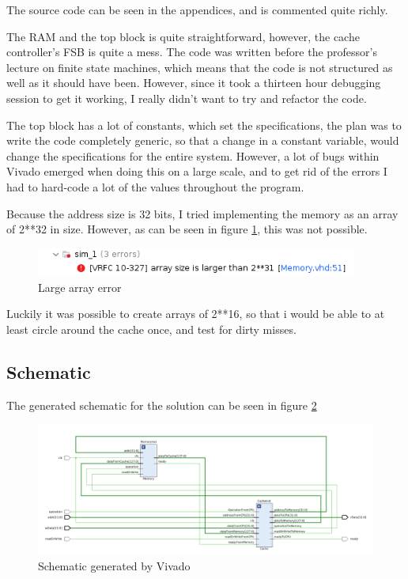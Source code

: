 \documentclass{article}
\begin{document}
The source code can be seen in the appendices, and is commented quite richly.

The RAM and the top block is quite straightforward, however, the cache controller's FSB is quite a mess. The code was written before the professor's lecture on finite state machines, which means that the code is not structured as well as it should have been. However, since it took a thirteen hour debugging session to get it working, I really didn't want to try and refactor the code.

The top block has a lot of constants, which set the specifications, the plan was to write the code completely generic, so that a change in a constant variable, would change the specifications for the entire system. However, a lot of bugs within Vivado emerged when doing this on a large scale, and to get rid of the errors I had to hard-code a lot of the values throughout the program.

Because the address size is 32 bits, I tried implementing the memory as an array of 2**32 in size. However, as can be seen in figure \ref{ERROR}, this was not possible.
\begin{figure}[H]
 \centering
  \includegraphics[width=300pt]{img/arraySizeError.png}
 \caption{Large array error}
  \label{ERROR}
 \end{figure}

Luckily it was possible to create arrays of 2**16, so that i would be able to at least circle around the cache once, and test for dirty misses.


\subsection{Schematic}
The generated schematic for the solution can be seen in figure \ref{SCHEMATIC}

\begin{figure}[H]
 \centering
  \includegraphics[width=400pt]{img/schematic211020.png}
 \caption{Schematic generated by Vivado}
  \label{SCHEMATIC}
 \end{figure}
\end{document}
